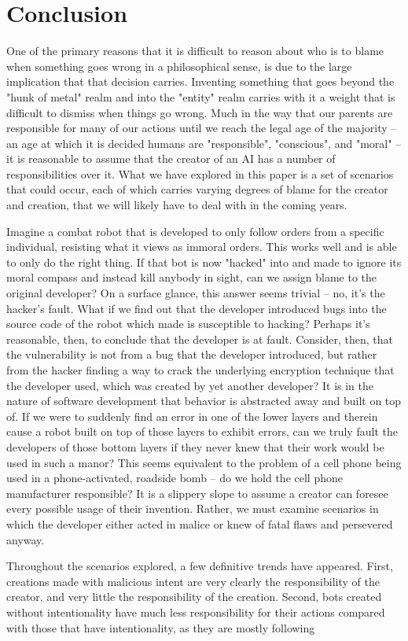 \documentclass[12]{article}
\begin{document}
\section{Conclusion}
	One of the primary reasons that it is difficult to reason about who is to blame when something goes wrong in a philosophical sense, is due to the large implication that that decision carries. Inventing something that goes beyond the "hunk of metal" realm and into the "entity" realm carries with it a weight that is difficult to dismiss when things go wrong. Much in the way that our parents are responsible for many of our actions until we reach the legal age of the majority -- an age at which it is decided humans are "responsible", "conscious", and "moral" -- it is reasonable to assume that the creator of an AI has a number of responsibilities over it. What we have explored in this paper is a set of scenarios that could occur, each of which carries varying degrees of blame for the creator and creation, that we will likely have to deal with in the coming years.
	
	Imagine a combat robot that is developed to only follow orders from a specific individual, resisting what it views as immoral orders. This works well and is able to only do the right thing. If that bot is now "hacked" into and made to ignore its moral compass and instead kill anybody in sight, can we assign blame to the original developer? On a surface glance, this answer seems trivial -- no, it's the hacker's fault. What if we find out that the developer introduced bugs into the source code of the robot which made is susceptible to hacking? Perhaps it's reasonable, then, to conclude that the developer is at fault. Consider, then, that the vulnerability is not from a bug that the developer introduced, but rather from the hacker finding a way to crack the underlying encryption technique that the developer used, which was created by yet another developer? It is in the nature of software development that behavior is abstracted away and built on top of. If we were to suddenly find an error in one of the lower layers and therein cause a robot built on top of those layers to exhibit errors, can we truly fault the developers of those bottom layers if they never knew that their work would be used in such a manor? This seems equivalent to the problem of a cell phone being used in a phone-activated, roadside bomb -- do we hold the cell phone manufacturer responsible? It is a slippery slope to assume a creator can foresee every possible usage of their invention. Rather, we must examine scenarios in which the developer either acted in malice or knew of fatal flaws and persevered anyway. 	
	
	Throughout the scenarios explored, a few definitive trends have appeared. First, creations made with malicious intent are very clearly the responsibility of the creator, and very little the responsibility of the creation. Second, bots created without intentionality have much less responsibility for their actions compared with those that have intentionality, as they are mostly following 

\newpage

\printbibliography[title={References}]
\end{document}
